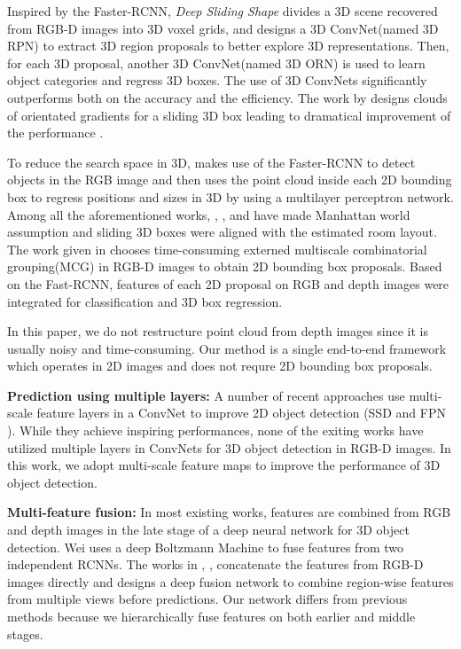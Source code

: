 \documentclass[10pt,twocolumn,letterpaper]{article}
\begin{document}
	Inspired by the Faster-RCNN, \emph{Deep Sliding Shape} \cite{Suran2016DSS} divides a 3D scene recovered from RGB-D images into 3D voxel grids, and designs a 3D ConvNet(named 3D RPN) to extract 3D region proposals to better explore 3D representations. Then, for each 3D proposal, another 3D ConvNet(named 3D ORN) is used to learn object categories and regress 3D boxes. The use of 3D ConvNets significantly outperforms \cite{Surans2014sliding} both on the accuracy and the efficiency. The work by \cite{Zhile2016COG} designs clouds of orientated gradients for a sliding 3D box leading to dramatical improvement of the performance \cite{Surans2014sliding}.\par
	
	To reduce the search space in 3D, \cite{Jeab20172DD} makes use of the Faster-RCNN to detect objects in the RGB image and then uses the point cloud inside each 2D bounding box to regress positions and sizes in 3D by using a multilayer perceptron network. Among all the aforementioned works, \cite{Surans2014sliding}, \cite{Suran2016DSS}, \cite{Zhile2016COG} and \cite{Jeab20172DD} have made Manhattan world assumption and sliding 3D boxes were aligned with the estimated room layout. The work given in \cite{Deng2017} chooses time-consuming externed multiscale combinatorial grouping(MCG) \cite{P2014MCG} in RGB-D images \cite{S2014rich} to obtain 2D bounding box proposals. Based on the Fast-RCNN, features of each 2D proposal on RGB and depth images were integrated for classification and 3D box regression. \par
	
	In this paper, we do not restructure point cloud from depth images since it is usually noisy and  time-consuming. Our method is a single end-to-end framework which operates in 2D images and does not requre 2D bounding box proposals.\par
	\vspace{1mm}
	\noindent\textbf{Prediction using multiple layers:} A number of recent approaches use multi-scale feature layers in a ConvNet to improve 2D object detection (\eg SSD \cite{Wei2016SSD} and FPN \cite{T2017FCN}). While they achieve inspiring performances, none of the exiting works have utilized multiple layers in ConvNets for 3D object detection in RGB-D images. In this work, we adopt multi-scale feature maps to improve the performance of 3D object detection.\par 
	\vspace{1mm}
	\noindent\textbf{Multi-feature fusion:} In most existing works, features are combined from RGB and depth images in the late stage of a deep neural network for 3D object detection. Wei \etal \cite{Wei2015DBM} uses a deep Boltzmann Machine to fuse features from two independent RCNNs. The works in \cite{Suran2016DSS}, \cite{S2014rich}, \cite{Deng2017} concatenate the features from RGB-D images directly and \cite{Multiview2017} designs a deep fusion network to combine region-wise features from multiple views before predictions. Our network differs from previous methods because we hierarchically fuse features on both earlier and middle stages.\par
	
\end{document}
